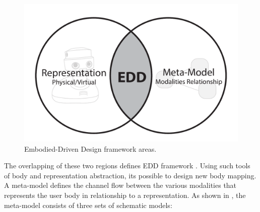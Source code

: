 \begin{figure}[b!]
  \centering
  \includegraphics[width=0.8\linewidth]{figures/concept/EDD.pdf}
  \captionsetup{justification=centering}
  \caption{Embodied-Driven Design framework areas.}
  \label{fig:concept-EDD}
\end{figure}

The overlapping of these two regions defines EDD framework . Using such tools of body and representation abstraction, its possible to design new body mapping. A meta-model defines the channel flow between the various modalities that represents the user body in relationship to a representation. As shown in , the meta-model consists of three sets of schematic models:

